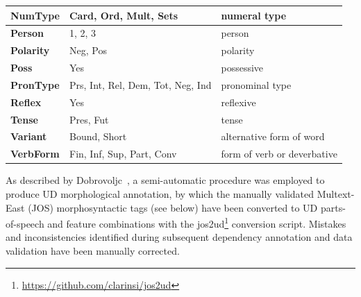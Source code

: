 \documentclass[a4paper,oneside,12pt]{article}
\begin{document}
\begin{samepage}
\begin{center}
\begin{tabular}{|l|l|l|}
      \textbf{NumType}          & Card, Ord, Mult, Sets             & numeral
      type                                                                       \\
      \hline
      \textbf{Person}           & 1, 2, 3                           & person
      \\ \hline
      \textbf{Polarity}         & Neg, Pos                          & polarity
      \\ \hline
      \textbf{Poss}             & Yes                               & possessive
      \\
      \hline
      \textbf{PronType}         & Prs, Int, Rel, Dem, Tot, Neg, Ind & pronominal
      type                                                                       \\
      \hline
      \textbf{Reflex}           & Yes                               & reflexive
      \\ \hline
      \textbf{Tense}            & Pres, Fut                         & tense
      \\ \hline
      \textbf{Variant}          & Bound, Short                      &
      alternative form of word                                                   \\ \hline
      \textbf{VerbForm}         & Fin, Inf, Sup, Part, Conv         & form of
      verb or deverbative                                                        \\ \hline
    \end{tabular}
  \end{center}
\end{samepage}
As described by Dobrovoljc~\cite{dobrovoljc2024extending}, a semi-automatic
procedure was employed to produce UD morphological annotation, by which the
manually validated Multext-East (JOS) morphosyntactic tags (see below) have been
converted to UD parts-of-speech and feature combinations with the
jos2ud\footnote{\url{https://github.com/clarinsi/jos2ud}} conversion script.
Mistakes and inconsistencies identified during subsequent dependency annotation
and data validation have been manually corrected.
\end{document}
